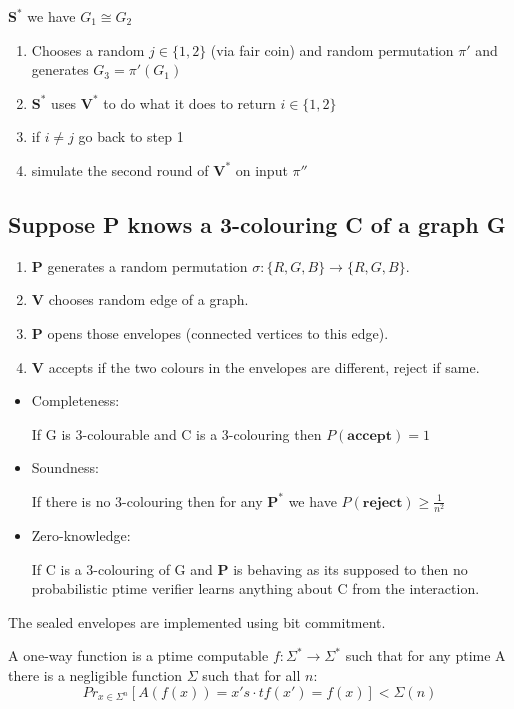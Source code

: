 \documentclass[a4paper,12pt]{article}
\theoremstyle{definition}
\theoremstyle{remark}
\begin{document}
$\textbf{S}^*$ we have $G_1 \cong G_2$
\begin{enumerate}
    \item Chooses a random $j \in \{1, 2\}$ (via fair coin) and random permutation $\pi'$ and generates $G_3 = \pi'(G_1)$
    \item $\textbf{S}^*$ uses $\textbf{V}^*$ to do what it does to return $i \in \{1, 2\}$
    \item if $i \neq j$ go back to step 1
    \item simulate the second round of $\textbf{V}^*$ on input $\pi''$
\end{enumerate}

\subsection*{Suppose P knows a 3-colouring C of a graph G}

\begin{enumerate}
    \item \textbf{P} generates a random permutation $\sigma: \{R, G, B\} \to \{R, G, B\}$.
    \item \textbf{V} chooses random edge of a graph.
    \item \textbf{P} opens those envelopes (connected vertices to this edge).
    \item \textbf{V} accepts if the two colours in the envelopes are different, reject if same.
\end{enumerate}

\begin{itemize}
    \item Completeness:
    
    If G is 3-colourable and C is a 3-colouring then $P(\textbf{accept}) = 1$

    \item Soundness:
    
    If there is no 3-colouring then for any $\textbf{P}^*$ we have $P(\textbf{reject}) \geq \frac{1}{n^2}$

    \item Zero-knowledge:
    
    If C is a 3-colouring of G and \textbf{P} is behaving as its supposed to then no probabilistic ptime verifier learns anything about C from the interaction.
\end{itemize}

The sealed envelopes are implemented using bit commitment.

A one-way function is a ptime computable $f: \Sigma^* \to \Sigma^*$ such that for any ptime A there is a negligible function
$\Sigma$ such that for all $n$:
\begin{equation*}
    Pr_{x \in \Sigma^n} [A(f(x)) = x' s \cdot t f(x') = f(x)] < \Sigma(n)
\end{equation*}
\end{document}
